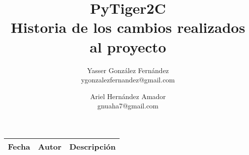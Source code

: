 \documentclass{article}
\title{
	\LARGE{PyTiger2C} \\
	\Large{Historia de los cambios realizados al proyecto}
}
\author{
  	Yasser González Fernández \\
  	\small{ygonzalezfernandez@gmail.com}
  	\and
  	Ariel Hernández Amador \\
  	\small{gnuaha7@gmail.com}
}
\date{}
\begin{document}
\maketitle

\thispagestyle{empty}

\newpage

\setcounter{page}{1}

\begin{center}
\begin{longtable}{|l|l|p{18em}|}
\hline 
\textbf{Fecha} & \textbf{Autor} & \textbf{Descripción} \\
\hline

\end{longtable}
\end{center}
\end{document}
